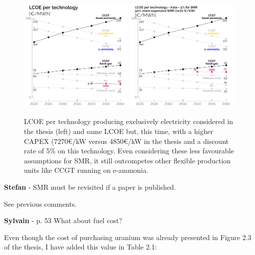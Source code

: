 \documentclass[12pt,a4paper]{article}
\begin{document}
\begin{figure}[htbp!]
\centering
\includegraphics[width=0.49\textwidth]{LCOE_line_2.pdf}
\includegraphics[width=0.49\textwidth]{LCOE_line_3.pdf}
\label{fig:LCOE_comparison}
\caption{LCOE per technology producing exclusively electricity considered in the thesis (left) and same LCOE but, this time, with a higher CAPEX (7270€/kW versus 4850€/kW in the thesis and a discount rate of 5\% on this technology. Even considering these less favourable assumptions for SMR, it still outcompetes other flexible production units like CCGT running on e-ammonia.}
\end{figure}

\begin{mdframed}[style=comment] %
{\color{teal} \textbf{Stefan}} - SMR must be revisited if a paper is published.
\end{mdframed}

\noindent See previous comments.

\begin{mdframed}[style=comment] %
{\color{purple} \textbf{Sylvain}} - p. 53 What about fuel cost?
\end{mdframed}

\noindent Even though the cost of purchasing uranium was already presented in Figure 2.3 of the thesis, I have added this value {\color{blue}in Table 2.1}:
\end{document}
